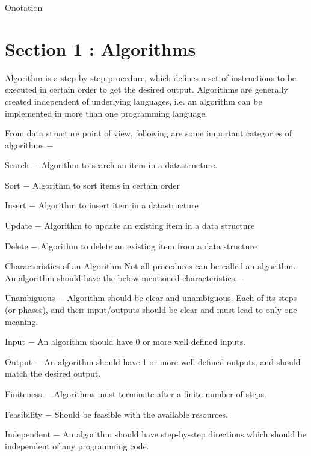 Onotation

\section{Section 1 : Algorithms}
\begin{frame}
Algorithm is a step by step procedure, which defines a set of instructions to be executed in certain order to get the desired output. Algorithms are generally created independent of underlying languages, i.e. an algorithm can be implemented in more than one programming language.

\end{frame}
\begin{frame}
From data structure point of view, following are some important categories of algorithms −

Search − Algorithm to search an item in a datastructure.

Sort − Algorithm to sort items in certain order

Insert − Algorithm to insert item in a datastructure

Update − Algorithm to update an existing item in a data structure

Delete − Algorithm to delete an existing item from a data structure
\end{frame}
\begin{frame}
Characteristics of an Algorithm
Not all procedures can be called an algorithm. An algorithm should have the below mentioned characteristics −

Unambiguous − Algorithm should be clear and unambiguous. Each of its steps (or phases), and their input/outputs should be clear and must lead to only one meaning.

Input − An algorithm should have 0 or more well defined inputs.

Output − An algorithm should have 1 or more well defined outputs, and should match the desired output.

Finiteness − Algorithms must terminate after a finite number of steps.

Feasibility − Should be feasible with the available resources.

Independent − An algorithm should have step-by-step directions which should be independent of any programming code.
\end{frame}
